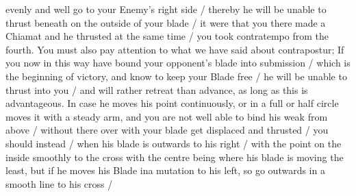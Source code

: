 \newpage


\newpage


evenly and well go to your Enemy's right side / thereby he will be
unable to thrust beneath on the outside of your blade / it were that
you there made a Chiamat and he thrusted at the same time / you took
contratempo from the fourth. You must also pay attention to what we
have said about contrapostur; If you now in this way have bound your
opponent's blade into submission / which is the beginning of victory,
and know to keep your Blade free / he will be unable to thrust into you
/ and will rather retreat than advance, as long as this is
advantageous. In case he moves his point continuously, or in a full or
half circle moves it with a steady arm,
and you are not well able to bind his weak from above / without there
over with your blade get displaced and thrusted / you should instead /
when his blade is outwards to his right / with the point on the inside
smoothly to the cross with the centre being where his blade is moving
the least, but if he moves his Blade ina mutation to his left, so go
outwards in a smooth line to his cross / 
